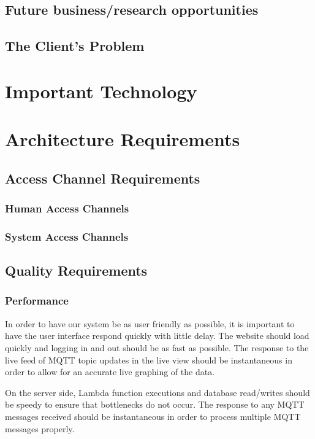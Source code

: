 \documentclass{article}
\begin{document}
\subsection{Future business/research opportunities}

\subsection{The Client's Problem}

\section{Important Technology}

\section{Architecture Requirements}

\subsection{Access Channel Requirements}

\subsubsection{Human Access Channels}

\subsubsection{System Access Channels}

	\subsection{Quality Requirements}
		\subsubsection{Performance}
			In order to have our system be as user friendly as possible, it is important to have the user interface respond quickly with little delay. The website should load quickly and logging in and out should be as fast as possible. The response to the live feed of MQTT topic updates in the live view should be instantaneous in order to allow for an accurate live graphing of the data.
				
			On the server side, Lambda function executions and database read/writes should be speedy to ensure that bottlenecks do not occur. The response to any MQTT messages received should be instantaneous in order to process multiple MQTT messages properly.
			
\end{document}
